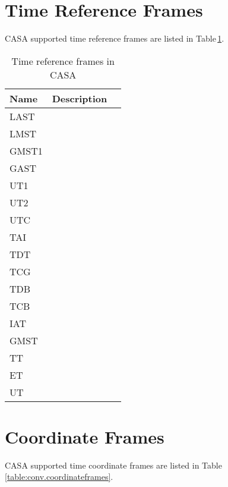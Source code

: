 \section{Time Reference Frames}
\label{section:conv.time}

CASA supported time reference frames are listed in Table\,\ref{table:conv.timeframes}.

\begin{table}[htb]
\caption{Time reference frames in CASA \label{table:conv.timeframes}}
\begin{center}
\begin{tabular}{lll}
Name & Description\\
\hline

LAST &   \\
LMST &   \\
GMST1 &   \\
GAST &   \\
UT1 &   \\
UT2 &   \\
UTC &   \\
TAI &   \\
TDT &   \\
TCG &   \\
TDB &   \\
TCB &   \\
IAT &   \\
GMST &   \\
TT &   \\
ET &   \\
UT &   \\
\end{tabular}
\end{center}
\end{table}




\section{Coordinate Frames}
\label{section:conv.coordinateframes}

CASA supported time coordinate frames are listed in Table\,\ref{table:conv.coordinateframes}.

